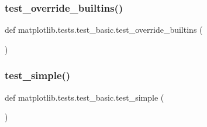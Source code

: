 \subsubsection{\texorpdfstring{test\+\_\+override\+\_\+builtins()}{test\_override\_builtins()}}
{\footnotesize\ttfamily def matplotlib.\+tests.\+test\+\_\+basic.\+test\+\_\+override\+\_\+builtins (\begin{DoxyParamCaption}{ }\end{DoxyParamCaption})}

\mbox{\label{namespacematplotlib_1_1tests_1_1test__basic_a13ca3ac5af29fcd46dc0027b422958ff}} 
\subsubsection{\texorpdfstring{test\+\_\+simple()}{test\_simple()}}
{\footnotesize\ttfamily def matplotlib.\+tests.\+test\+\_\+basic.\+test\+\_\+simple (\begin{DoxyParamCaption}{ }\end{DoxyParamCaption})}


